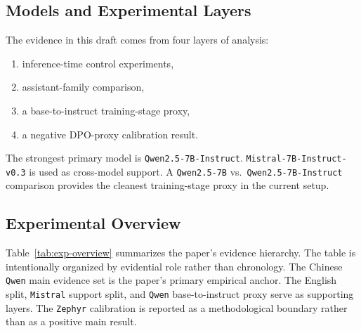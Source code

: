 \documentclass[11pt]{article}
\begin{document}
\subsection{Models and Experimental Layers}
The evidence in this draft comes from four layers of analysis:
\begin{enumerate}[leftmargin=1.5em]
  \item inference-time control experiments,
  \item assistant-family comparison,
  \item a base-to-instruct training-stage proxy,
  \item a negative DPO-proxy calibration result.
\end{enumerate}

The strongest primary model is \texttt{Qwen2.5-7B-Instruct}. \texttt{Mistral-7B-Instruct-v0.3} is used as cross-model support. A \texttt{Qwen2.5-7B} vs.\ \texttt{Qwen2.5-7B-Instruct} comparison provides the cleanest training-stage proxy in the current setup.

\subsection{Experimental Overview}
Table~\ref{tab:exp-overview} summarizes the paper's evidence hierarchy. The table is intentionally organized by evidential role rather than chronology. The Chinese \texttt{Qwen} main evidence set is the paper's primary empirical anchor. The English split, \texttt{Mistral} support split, and \texttt{Qwen} base-to-instruct proxy serve as supporting layers. The \texttt{Zephyr} calibration is reported as a methodological boundary rather than as a positive main result.
\end{document}
